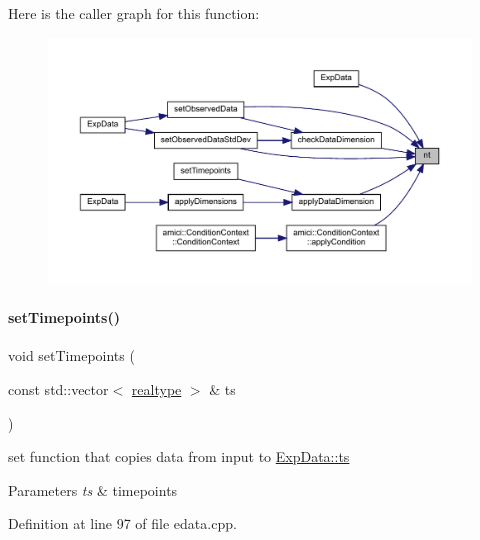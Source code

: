 Here is the caller graph for this function\+:
\nopagebreak
\begin{figure}[H]
\begin{center}
\leavevmode
\includegraphics[width=350pt]{classamici_1_1_exp_data_a4c23d300cbe15b0afb1ee3731d47cc93_icgraph}
\end{center}
\end{figure}
\mbox{\label{classamici_1_1_exp_data_a058fb6c96339b5116b1af937bc77c2e4}} 
\paragraph{\texorpdfstring{setTimepoints()}{setTimepoints()}}
{\footnotesize\ttfamily void set\+Timepoints (\begin{DoxyParamCaption}\item[{const std\+::vector$<$ \mbox{\hyperlink{namespaceamici_a1bdce28051d6a53868f7ccbf5f2c14a3}{realtype}} $>$ \&}]{ts }\end{DoxyParamCaption})}

set function that copies data from input to \mbox{\hyperlink{classamici_1_1_exp_data_aa7014a80e7b102f85a10e3b9a480e8e5}{Exp\+Data\+::ts}}


\begin{DoxyParams}{Parameters}
{\em ts} & timepoints \\
\hline
\end{DoxyParams}


Definition at line 97 of file edata.\+cpp.

